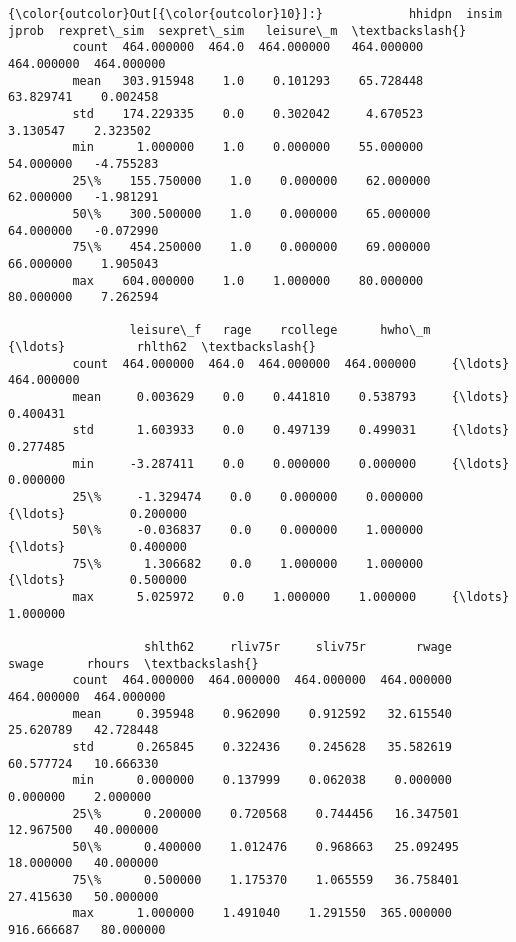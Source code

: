 \documentclass[11pt]{article}
\begin{document}
\begin{Verbatim}[commandchars=\\\{\}]
{\color{outcolor}Out[{\color{outcolor}10}]:}            hhidpn  insim       jprob  rexpret\_sim  sexpret\_sim   leisure\_m  \textbackslash{}
         count  464.000000  464.0  464.000000   464.000000   464.000000  464.000000   
         mean   303.915948    1.0    0.101293    65.728448    63.829741    0.002458   
         std    174.229335    0.0    0.302042     4.670523     3.130547    2.323502   
         min      1.000000    1.0    0.000000    55.000000    54.000000   -4.755283   
         25\%    155.750000    1.0    0.000000    62.000000    62.000000   -1.981291   
         50\%    300.500000    1.0    0.000000    65.000000    64.000000   -0.072990   
         75\%    454.250000    1.0    0.000000    69.000000    66.000000    1.905043   
         max    604.000000    1.0    1.000000    80.000000    80.000000    7.262594   
         
                 leisure\_f   rage    rcollege      hwho\_m     {\ldots}          rhlth62  \textbackslash{}
         count  464.000000  464.0  464.000000  464.000000     {\ldots}       464.000000   
         mean     0.003629    0.0    0.441810    0.538793     {\ldots}         0.400431   
         std      1.603933    0.0    0.497139    0.499031     {\ldots}         0.277485   
         min     -3.287411    0.0    0.000000    0.000000     {\ldots}         0.000000   
         25\%     -1.329474    0.0    0.000000    0.000000     {\ldots}         0.200000   
         50\%     -0.036837    0.0    0.000000    1.000000     {\ldots}         0.400000   
         75\%      1.306682    0.0    1.000000    1.000000     {\ldots}         0.500000   
         max      5.025972    0.0    1.000000    1.000000     {\ldots}         1.000000   
         
                   shlth62     rliv75r     sliv75r       rwage       swage      rhours  \textbackslash{}
         count  464.000000  464.000000  464.000000  464.000000  464.000000  464.000000   
         mean     0.395948    0.962090    0.912592   32.615540   25.620789   42.728448   
         std      0.265845    0.322436    0.245628   35.582619   60.577724   10.666330   
         min      0.000000    0.137999    0.062038    0.000000    0.000000    2.000000   
         25\%      0.200000    0.720568    0.744456   16.347501   12.967500   40.000000   
         50\%      0.400000    1.012476    0.968663   25.092495   18.000000   40.000000   
         75\%      0.500000    1.175370    1.065559   36.758401   27.415630   50.000000   
         max      1.000000    1.491040    1.291550  365.000000  916.666687   80.000000   
         

\end{Verbatim}
\end{document}
